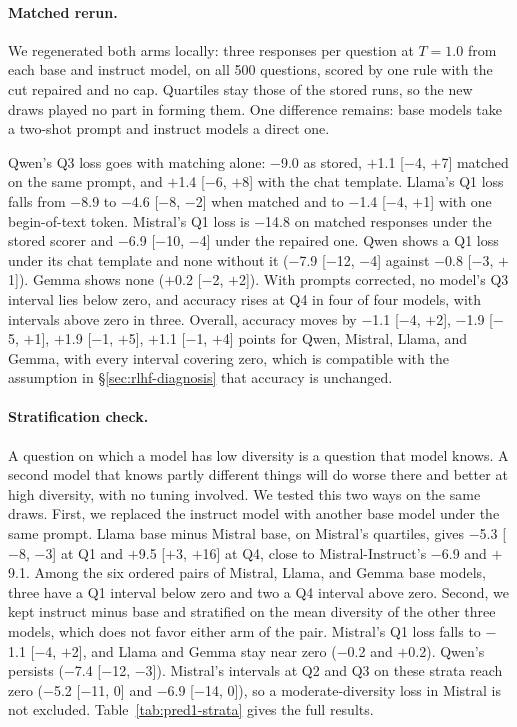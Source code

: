 \paragraph{Matched rerun.} We regenerated both arms locally: three responses per question at $T=1.0$ from each base and instruct model, on all 500 questions, scored by one rule with the cut repaired and no cap. Quartiles stay those of the stored runs, so the new draws played no part in forming them. One difference remains: base models take a two-shot prompt and instruct models a direct one.

Qwen's Q3 loss goes with matching alone: $-$9.0 as stored, $+$1.1 [$-$4, $+$7] matched on the same prompt, and $+$1.4 [$-$6, $+$8] with the chat template. Llama's Q1 loss falls from $-$8.9 to $-$4.6 [$-$8, $-$2] when matched and to $-$1.4 [$-$4, $+$1] with one begin-of-text token. Mistral's Q1 loss is $-$14.8 on matched responses under the stored scorer and $-$6.9 [$-$10, $-$4] under the repaired one. Qwen shows a Q1 loss under its chat template and none without it ($-$7.9 [$-$12, $-$4] against $-$0.8 [$-$3, $+$1]). Gemma shows none ($+$0.2 [$-$2, $+$2]). With prompts corrected, no model's Q3 interval lies below zero, and accuracy rises at Q4 in four of four models, with intervals above zero in three. Overall, accuracy moves by $-$1.1 [$-$4, $+$2], $-$1.9 [$-$5, $+$1], $+$1.9 [$-$1, $+$5], $+$1.1 [$-$1, $+$4] points for Qwen, Mistral, Llama, and Gemma, with every interval covering zero, which is compatible with the assumption in \S\ref{sec:rlhf-diagnosis} that accuracy is unchanged.

\paragraph{Stratification check.} A question on which a model has low diversity is a question that model knows. A second model that knows partly different things will do worse there and better at high diversity, with no tuning involved. We tested this two ways on the same draws. First, we replaced the instruct model with another base model under the same prompt. Llama base minus Mistral base, on Mistral's quartiles, gives $-$5.3 [$-$8, $-$3] at Q1 and $+$9.5 [$+$3, $+$16] at Q4, close to Mistral-Instruct's $-$6.9 and $+$9.1. Among the six ordered pairs of Mistral, Llama, and Gemma base models, three have a Q1 interval below zero and two a Q4 interval above zero. Second, we kept instruct minus base and stratified on the mean diversity of the other three models, which does not favor either arm of the pair. Mistral's Q1 loss falls to $-$1.1 [$-$4, $+$2], and Llama and Gemma stay near zero ($-$0.2 and $+$0.2). Qwen's persists ($-$7.4 [$-$12, $-$3]). Mistral's intervals at Q2 and Q3 on these strata reach zero ($-$5.2 [$-$11, 0] and $-$6.9 [$-$14, 0]), so a moderate-diversity loss in Mistral is not excluded. Table~\ref{tab:pred1-strata} gives the full results.


